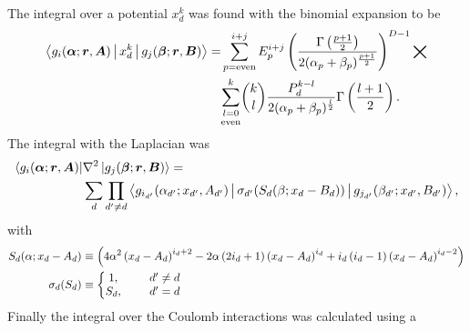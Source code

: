     The integral over a potential $x^k_d$ was found with the binomial expansion
    to be
        \begin{equation}
            \begin{aligned}
                \Braket{g_i(\blds{\alpha};\blds{r},\blds{A}) | x^k_d |
                g_j(\blds{\beta};\blds{r},\blds{B})} =&
                \suml{p=\text{even}}{i+j} E^{i+j}_p
                \left(\frac{\Gamma\left(\frac{p+1}{2}\right)}
                {2(\alpha_p+\beta_p)^{\frac{p+1}{2}}}\right)^{D-1} \bigtimes \\
                &\underset{\text{even}}{\sum\limits_{l=0}^k} {k\choose l}
                \frac{P^{k-l}_d}{2(\alpha_p+\beta_p)^{\frac{l}{2}}}
                \Gamma\left(\frac{l+1}{2}\right).
            \end{aligned}
        \end{equation}
    The integral with the Laplacian was
        \begin{equation}
            \begin{aligned}
                \Bra{g_i(\blds{\alpha};\blds{r},\blds{A})} &\nabla^2
                \Ket{g_j(\blds{\beta};\blds{r},\blds{B})} = \\
                &\sum_d\prod_{d'\neq d}
                \Braket{g_{i_{d'}}(\alpha_{d'};x_{d'},A_{d'})
                |\sigma_{d'}(S_d(\beta;x_d-B_d))|g_{j_{d'}}(\beta_{d'};x_{d'},B_{d'})},
            \end{aligned}
            \label{eq:lapintdefsum}
        \end{equation}
    with
        \begin{equation}
            \begin{aligned}
                S_d(\alpha;x_d-A_d) &\equiv
                \left(4\alpha^2\left(x_d-A_d\right)^{i_d+2} -
                2\alpha\left(2i_d+1\right)\left(x_d-A_d\right)^{i_d} +
                i_d\left(i_d-1\right)\left(x_d-A_d\right)^{i_d-2}\right) \\
                \sigma_d(S_d) &\equiv \left\{\begin{matrix}
                                            1,&\indent d' \neq d \\
                                            S_d,&\indent d' = d
                                            \end{matrix}
                                        \right.
            \end{aligned}
        \end{equation}
    Finally the integral over the Coulomb interactions was calculated using a
